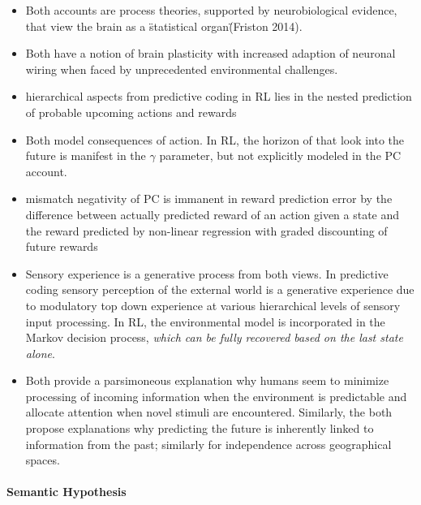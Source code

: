 \documentclass{article} %
\begin{document}
\begin{itemize}
  \item Both accounts are process theories, supported by
  neurobiological evidence, that
  view the brain as a \"statistical organ\" (Friston 2014).
  \item Both have a notion of brain plasticity with increased
  adaption of neuronal wiring when faced by unprecedented environmental
  challenges.
  \item hierarchical aspects from predictive coding in RL lies in the
  nested prediction of probable upcoming actions and rewards
  \item Both model consequences of action. In RL, the horizon of that
  look into the future is manifest in the $\gamma$ parameter, but not
  explicitly modeled in the PC account.
  \item mismatch negativity of PC is immanent in reward prediction error
  by the difference between actually predicted reward of an action given
  a state and the reward predicted by non-linear regression with graded
  discounting of future rewards
  \item Sensory experience is a generative process from both views.
  In predictive coding sensory perception of the external world
  is a generative experience due to modulatory top down experience at
  various hierarchical levels of sensory input processing.
  In RL, the environmental model is incorporated in the Markov decision
  process, \textit{which can be fully recovered based on the last
  state alone}.
  \item Both provide a parsimoneous explanation why
  humans seem to minimize processing of incoming information
  when the environment is predictable and allocate attention when
  novel stimuli are encountered.
  Similarly, the both propose explanations why
  predicting the future is inherently
  linked to information from the past; similarly for independence across
  geographical spaces.
\end{itemize}



\paragraph{Semantic Hypothesis}
\end{document}
